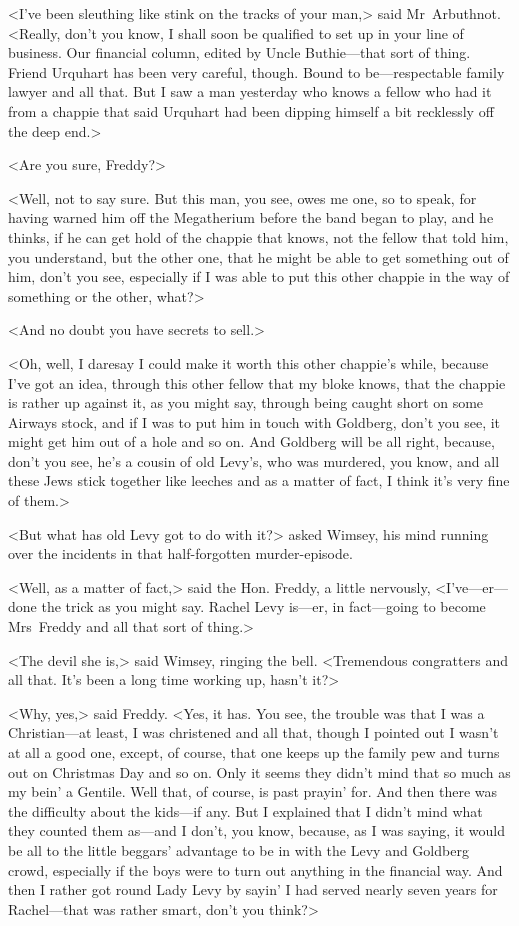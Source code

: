 <I've been sleuthing like stink on the tracks of your man,> said Mr~Arbuthnot. <Really, don't you know, I shall soon be qualified to set up in your line of business. Our financial column, edited by Uncle Buthie—that sort of thing. Friend Urquhart has been very careful, though. Bound to be—respectable family lawyer and all that. But I saw a man yesterday who knows a fellow who had it from a chappie that said Urquhart had been dipping himself a bit recklessly off the deep end.>

<Are you sure, Freddy?>

<Well, not to say sure. But this man, you see, owes me one, so to speak, for having warned him off the Megatherium before the band began to play, and he thinks, if he can get hold of the chappie that knows, not the fellow that told him, you understand, but the other one, that he might be able to get something out of him, don't you see, especially if I was able to put this other chappie in the way of something or the other, what?>

<And no doubt you have secrets to sell.>

<Oh, well, I daresay I could make it worth this other chappie's while, because I've got an idea, through this other fellow that my bloke knows, that the chappie is rather up against it, as you might say, through being caught short on some Airways stock, and if I was to put him in touch with Goldberg, don't you see, it might get him out of a hole and so on. And Goldberg will be all right, because, don't you see, he's a cousin of old Levy's, who was murdered, you know, and all these Jews stick together like leeches and as a matter of fact, I think it's very fine of them.>

<But what has old Levy got to do with it?> asked Wimsey, his mind running over the incidents in that half-forgotten murder-episode.

<Well, as a matter of fact,> said the Hon. Freddy, a little nervously, <I've—er—done the trick as you might say. Rachel Levy is—er, in fact—going to become Mrs~Freddy and all that sort of thing.>

<The devil she is,> said Wimsey, ringing the bell. <Tremendous congratters and all that. It's been a long time working up, hasn't it?>

<Why, yes,> said Freddy. <Yes, it has. You see, the trouble was that I was a Christian—at least, I was christened and all that, though I pointed out I wasn't at all a good one, except, of course, that one keeps up the family pew and turns out on Christmas Day and so on. Only it seems they didn't mind that so much as my bein' a Gentile. Well that, of course, is past prayin' for. And then there was the difficulty about the kids—if any. But I explained that I didn't mind what they counted them as—and I don't, you know, because, as I was saying, it would be all to the little beggars' advantage to be in with the Levy and Goldberg crowd, especially if the boys were to turn out anything in the financial way. And then I rather got round Lady Levy by sayin' I had served nearly seven years for Rachel—that was rather smart, don't you think?>

